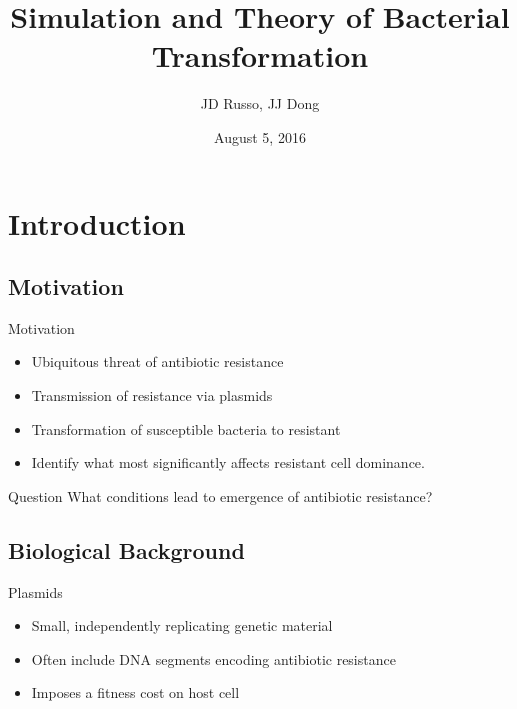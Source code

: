 \documentclass[11pt]{beamer}              %
\title{Simulation and Theory of Bacterial Transformation}
\date{August 5, 2016}
\author{JD Russo, JJ Dong}
\institute{Department of Physics and Astronomy\\Bucknell University}
\begin{document}
\maketitle

\section{Introduction}

\subsection{Motivation}
\begin{frame}{Motivation}
  \begin{itemize}
    \item Ubiquitous threat of antibiotic resistance
    \item Transmission of resistance via plasmids
    \item Transformation of susceptible bacteria to resistant %
    \item Identify what most significantly affects resistant cell dominance.
  \end{itemize}

  \vspace*{\fill}
    \begin{alertblock}{Question}
      What conditions lead to emergence of antibiotic resistance?
    \end{alertblock}
  \vspace*{\fill}

\end{frame}



\subsection{Biological Background}
\begin{frame}[fragile]{Plasmids}
  \begin{itemize}
    \item Small, independently replicating genetic material
    \item Often include DNA segments encoding antibiotic resistance
    \item Imposes a fitness cost on host cell
  \end{itemize}
\end{frame}
\end{document}
